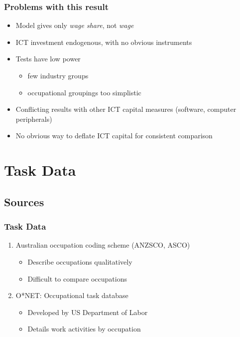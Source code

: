 \documentclass[red]{beamer}
\newcommand{\vitem}{\vfill\item}
\begin{document}
\begin{frame}[c]
  \frametitle{Problems with this result}
  \begin{itemize}
    \vitem Model gives only {\em wage share}, not {\em wage}
    \pause
    \vitem ICT investment endogenous, with no obvious instruments
    \pause
    \vitem Tests have low power
    \begin{itemize}
      \item few industry groups
      \item occupational groupings too simplistic
    \end{itemize}
    \pause
    \vitem Conflicting results with other ICT capital measures 
           (software, computer peripherals)
    \pause
    \vitem No obvious way to deflate ICT capital for consistent comparison
  \end{itemize}
\end{frame}

\section{Task Data}
\subsection{Sources}
\begin{frame}
  \frametitle{Task Data}
  \begin{enumerate}
  \vitem Australian occupation coding scheme (ANZSCO, ASCO)
    \begin{itemize}
    \vitem Describe occupations qualitatively
    \vitem Difficult to compare occupations
    \end{itemize}
    \vspace{10pt}
  \vitem O*NET: Occupational task database
    \begin{itemize}
    \vitem Developed by US Department of Labor
    \vitem Details work activities by occupation
    \end{itemize}
  \end{enumerate}
\end{frame}
\end{document}
